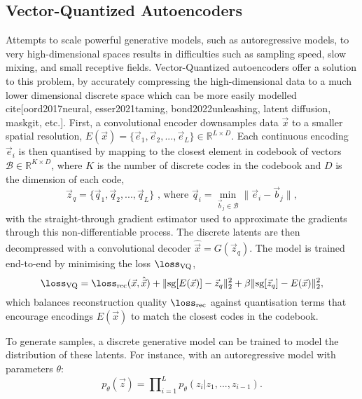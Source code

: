 \subsection{Vector-Quantized Autoencoders}
\noindent Attempts to scale powerful generative models, such as autoregressive models, to very high-dimensional spaces results in difficulties such as sampling speed, slow mixing, and small receptive fields. Vector-Quantized autoencoders offer a solution to this problem, by accurately compressing the high-dimensional data to a much lower dimensional discrete space which can be more easily modelled cite[oord2017neural, esser2021taming, bond2022unleashing, latent diffusion, maskgit, etc.]. First, a convolutional encoder downsamples data $\vec{x}$ to a smaller spatial resolution, $E(\vec{x}) = \{\vec{e}_1, \vec{e}_2, ..., \vec{e}_L\} \in \mathbb{R}^{L \times D}$. Each continuous encoding $\vec{e}_i$ is then quantised by mapping to the closest element in codebook of vectors $\mathcal{B} \in \mathbb{R}^{K \times D}$, where $K$ is the number of discrete codes in the codebook and $D$ is the dimension of each code,
%
\begin{equation}\label{eqn:quantisation}
    \vec{z}_q = \{\vec{q}_1, \vec{q}_2, ..., \vec{q}_L\} \text{  , where  } \vec{q}_i = \underset{\vec{b}_{j} \in \mathcal{B}}{\operatorname{min}}\|\vec{e}_i - \vec{b}_j\|,
\end{equation}
with the straight-through gradient estimator \cite{bengio2013estimating} used to approximate the gradients through this non-differentiable process. The discrete latents are then decompressed with a convolutional decoder $\hat{\vec{x}}= G(\vec{z}_q)$. The model is trained end-to-end by minimising the loss $\loss_\text{VQ}$,
%
\begin{equation}\label{eqn:vqvae-loss}
    \loss_\text{VQ} = \loss_\text{rec}(\vec{x}, \hat{\vec{x}}) + \| \text{sg}[E(\vec{x})] - \vec{z}_q \|_2^2 + \beta \| \text{sg}[\vec{z}_q] - E(\vec{x}) \|_2^2,
\end{equation}
which balances reconstruction quality $\loss_\text{rec}$ against quantisation terms that encourage encodings $E(\vec{x})$ to match the closest codes in the codebook.

To generate samples, a discrete generative model can be trained to model the distribution of these latents. For instance, with an autoregressive model with parameters $\theta$:
%
\begin{equation}
    p_\theta(\vec{z}) = \prod\nolimits_{i=1}^{L}p_\theta(z_i|z_1, ..., z_{i-1}).
\end{equation}



